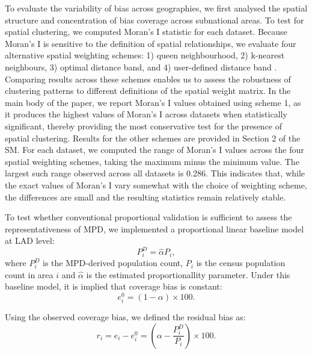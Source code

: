 \documentclass[]{rsos}%
\begin{document}
To evaluate the variability of bias across geographies, we first
analysed the spatial structure and concentration of bias coverage across
subnational areas. To test for spatial clustering, we computed Moran's I
statistic for each dataset. Because Moran's I is sensitive to the
definition of spatial relationships, we evaluate four alternative
spatial weighting schemes: 1) queen neighbourhood, 2) k-nearest
neighbours, 3) optimal distance band, and 4) user-defined distance band
\citep{rey2023}. Comparing results across these schemes enables us to assess
the robustness of clustering patterns to different definitions of the
spatial weight matrix. In the main body of the paper, we report Moran's
I values obtained using scheme 1, as it produces the highest values of
Moran's I across datasets when statistically significant, thereby
providing the most conservative test for the presence of spatial
clustering. Results for the other schemes are provided in Section 2 of
the SM. For each dataset, we computed the range of Moran's I values
across the four spatial weighting schemes, taking the maximum minus the
minimum value. The largest such range observed across all datasets is
0.286. This indicates that, while the exact values of Moran's I vary
somewhat with the choice of weighting scheme, the differences are small
and the resulting statistics remain relatively stable.

To test whether conventional proportional validation is sufficient to
assess the representativeness of MPD, we implemented a proportional
linear baseline model at LAD level: \begin{equation}
P_i^D = \hat{\alpha} P_i,
\end{equation} where \(P_i^D\) is the MPD-derived population count, \(P_i\)
is the census population count in area \(i\) and \(\hat{\alpha}\) is the
estimated proportionallity parameter. Under this baseline model, it is
implied that coverage bias is constant: \begin{equation}
e^0_i = (1-\alpha)\times 100.
\end{equation}

Using the observed coverage bias, we defined the residual bias as:
\begin{equation}\label{eq:residual}
r_i = e_i - e_i^0 = (\alpha - \dfrac{P_i^D}{P_i})\times 100.
\end{equation}
\end{document}
